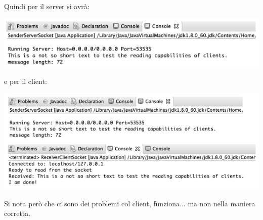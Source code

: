 \documentclass[a4paper,12pt, oneside]{book}
\begin{document}
Quindi per il server si avrà:
\begin{center}
\includegraphics[scale=2.5]{img/sc5.png}
\end{center}
e per il client:
\begin{center}
\includegraphics[scale=2.5]{img/sc6.png}
\end{center}
Si nota però che ci sono dei problemi col client, funziona... ma non nella maniera corretta.\\
\end{document}
